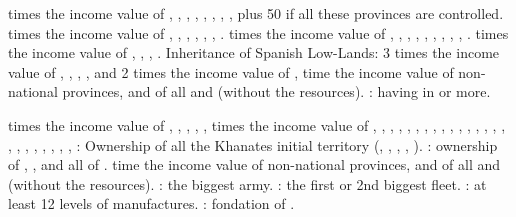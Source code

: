 times the income value of ,
, , ,
, , ,
, plus 50 \VPs if all these provinces are controlled.
 times the income value of ,
, , ,
, , .
 times the income value of ,
, , ,
, ,
, , ,
.
 times the income value of ,
, , .
\bparag Inheritance of Spanish Low-Lands: 3 times the income value of
, , ,
,  and 2 times the income value
of , 
 time the income value of non-national provinces, and of all \COL and
\TP (without the resources).
 \VPs: having  in \AM or more.

 times the income value of ,
, , ,
, 
 times the income value of ,
, , ,
, , ,
, ,
, , ,
, , ,
, , ,
, , ,
, , ,
 \VPs: Ownership of all the Khanates initial territory
(\paysSteppes, \paysKazan, \paysCosaquesdon, \paysAstrakhan, \paysCrimee).
 \VPs: ownership of \provinceNeva, \provinceLietuva,
\provinceEstland and all of \regionFinlande.
 time the income value of non-national provinces, and of all \COL and
\TP (without the resources).
 \VPs: the biggest army.
 \VPs: the first or 2nd biggest fleet.
 \VPs: at least 12 levels of manufactures.
 \VPs: fondation of .

